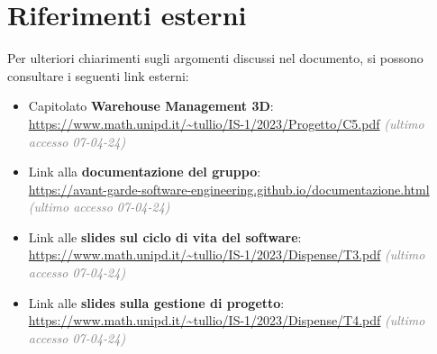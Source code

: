 \newpage


\newpage
\newpage
\section{Riferimenti esterni}\label{sec:riferimenti_esterni}
Per ulteriori chiarimenti sugli argomenti discussi nel documento, si possono consultare i seguenti link esterni:
\begin{itemize}
    \item Capitolato \textbf{Warehouse Management 3D}:\\
    \url{https://www.math.unipd.it/~tullio/IS-1/2023/Progetto/C5.pdf} \textcolor{gray}{\textit{(ultimo accesso 07-04-24)}}
    \item Link alla \textbf{documentazione del gruppo}:\\
    \url{https://avant-garde-software-engineering.github.io/documentazione.html} \textcolor{gray}{\textit{(ultimo accesso 07-04-24)}}
    \item Link alle \textbf{slides sul ciclo di vita del software}:\\
    \url{https://www.math.unipd.it/~tullio/IS-1/2023/Dispense/T3.pdf} \textcolor{gray}{\textit{(ultimo accesso 07-04-24)}}
    \item Link alle \textbf{slides sulla gestione di progetto}:\\
    \url{https://www.math.unipd.it/~tullio/IS-1/2023/Dispense/T4.pdf} \textcolor{gray}{\textit{(ultimo accesso 07-04-24)}} 
\end{itemize}